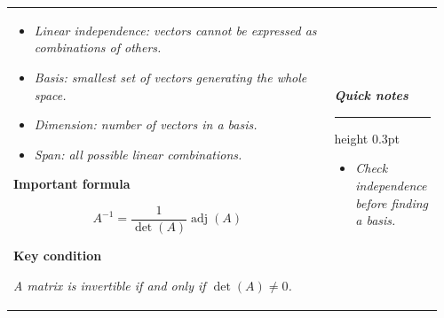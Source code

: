 \documentclass[10pt,a4paper]{article}
\begin{document}
\begin{tabular}{p{0.72\linewidth}|p{0.24\linewidth}}
\begin{minipage}[t]{\linewidth}
\begin{itemize}
\item \textit{Linear independence: vectors cannot be expressed as combinations of others.}

\item \textit{Basis: smallest set of vectors generating the whole space.}

\item \textit{Dimension: number of vectors in a basis.}

\item \textit{Span: all possible linear combinations.}

\end{itemize}



\vspace{3mm}



\textbf{Important formula}


\[
A^{-1}
=
\frac{1}{\det(A)}
\operatorname{adj}(A)
\]



\vspace{2mm}



\textbf{Key condition}


\textit{
A matrix is invertible if and only if
$\det(A)\neq0$.
}



\end{minipage}



&




\begin{minipage}[t]{\linewidth}


\textit{\textbf{Quick notes}}


\vspace{2mm}

\hrule height 0.3pt

\vspace{3mm}



\begin{itemize}

\item \textit{Check independence before finding a basis.}

\end{itemize}




\end{minipage}
\end{tabular}
\end{document}
